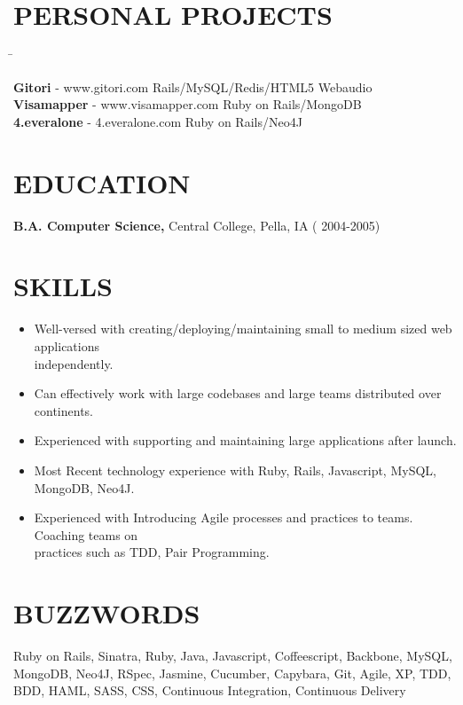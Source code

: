 \documentclass{res}
\begin{document}
\begin{resume}
\section{PERSONAL PROJECTS}  \vspace{-0.01in}   
   \begin{tabbing}
   \hspace{3.3in}\= \kill %

    {\bf Gitori} - www.gitori.com   \>Rails/MySQL/Redis/HTML5 Webaudio \\

    {\bf Visamapper} - www.visamapper.com   \>Ruby on Rails/MongoDB \\
 
    {\bf 4.everalone} - 4.everalone.com \>Ruby on Rails/Neo4J \\
\end{tabbing}

\section{EDUCATION}\vspace{0.15in}
    {\bf B.A. Computer Science,} Central College, Pella, IA
   ( 2004-2005)


\section{SKILLS} \vspace{0.3in}         
 \begin{itemize} \itemsep 0pt  
 \setlength{\itemindent}{-1.8em}
\item Well-versed with creating/deploying/maintaining small to medium sized web applications\\ independently.
\item Can effectively work with large codebases and large teams distributed over continents.
\item Experienced with supporting and maintaining large applications after launch.
\item Most Recent technology experience with Ruby, Rails, Javascript, MySQL, MongoDB, Neo4J. 
\item Experienced with Introducing Agile processes and practices to teams. Coaching teams on \\practices such as TDD, Pair Programming.

 \end{itemize}


\section{BUZZWORDS}\vspace{0.15in}
Ruby on Rails, Sinatra, Ruby, Java, Javascript, Coffeescript, Backbone, MySQL, MongoDB, Neo4J, RSpec, Jasmine, Cucumber, Capybara, Git, Agile, XP, TDD, BDD, HAML, SASS, CSS, Continuous Integration, Continuous Delivery 
 
\end{resume}
\end{document}
